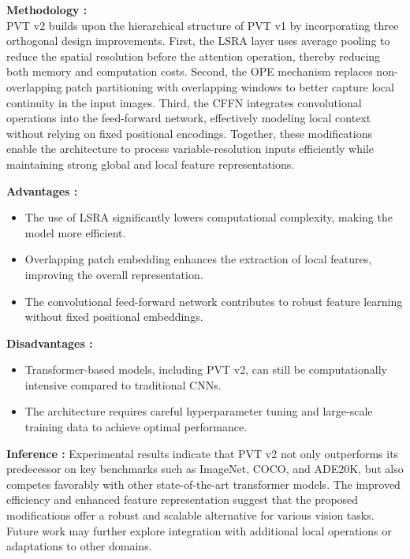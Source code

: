 \documentclass[11pt]{report}
\begin{document}
\textbf{Methodology :} \\
PVT v2 builds upon the hierarchical structure of PVT v1 by incorporating three orthogonal design improvements. First, the LSRA layer uses average pooling to reduce the spatial resolution before the attention operation, thereby reducing both memory and computation costs. Second, the OPE mechanism replaces non-overlapping patch partitioning with overlapping windows to better capture local continuity in the input images. Third, the CFFN integrates convolutional operations into the feed-forward network, effectively modeling local context without relying on fixed positional encodings. Together, these modifications enable the architecture to process variable-resolution inputs efficiently while maintaining strong global and local feature representations.

\textbf{Advantages : }  
\begin{itemize}
    \item The use of LSRA significantly lowers computational complexity, making the model more efficient.
    \item Overlapping patch embedding enhances the extraction of local features, improving the overall representation.
    \item The convolutional feed-forward network contributes to robust feature learning without fixed positional embeddings.
\end{itemize}

\textbf{Disadvantages : }  
\begin{itemize}
    \item Transformer-based models, including PVT v2, can still be computationally intensive compared to traditional CNNs.
    \item The architecture requires careful hyperparameter tuning and large-scale training data to achieve optimal performance.
\end{itemize}

\textbf{Inference : }
Experimental results indicate that PVT v2 not only outperforms its predecessor on key benchmarks such as ImageNet, COCO, and ADE20K, but also competes favorably with other state-of-the-art transformer models. The improved efficiency and enhanced feature representation suggest that the proposed modifications offer a robust and scalable alternative for various vision tasks. Future work may further explore integration with additional local operations or adaptations to other domains.
\end{document}
